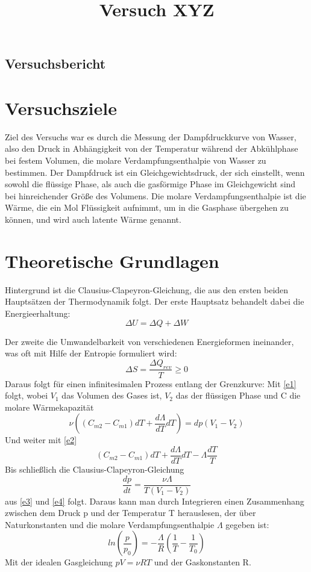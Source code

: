 \documentclass[]{article}
\title{Versuch XYZ}
\begin{document}
	\begin{center}
		\section*{Versuchsbericht}
	\end{center}
\tableofcontents
\section{Versuchsziele}
Ziel des Versuchs war es durch die Messung der Dampfdruckkurve von Wasser, also den Druck in Abhängigkeit von der Temperatur während der Abkühlphase bei festem Volumen, die molare Verdampfungsenthalpie von Wasser zu bestimmen. Der Dampfdruck ist ein Gleichgewichtsdruck, der sich einstellt, wenn sowohl die flüssige Phase, als auch die gasförmige Phase im Gleichgewicht sind bei hinreichender Größe des Volumens. Die molare Verdampfungsenthalpie ist die Wärme, die ein Mol Flüssigkeit aufnimmt, um in die Gasphase übergehen zu können, und wird auch latente Wärme genannt.
\section{Theoretische Grundlagen}
Hintergrund ist die Clausius-Clapeyron-Gleichung, die aus den ersten beiden Hauptsätzen der Thermodynamik folgt.
Der erste Hauptsatz behandelt dabei die Energieerhaltung:
\begin{equation}
	\Delta U =\Delta Q +\Delta W
	\label{e1}
\end{equation}

Der zweite die Umwandelbarkeit von verschiedenen Energieformen ineinander, was oft mit Hilfe der Entropie formuliert wird:
\begin{equation} 
 	 \Delta S=\frac{\Delta Q_{rev}}{T} \ge 0
 	 \label{e2}
 \end{equation}
Daraus folgt für einen infinitesimalen Prozess entlang der Grenzkurve:
Mit \ref{e1} folgt, wobei $V_1$ das Volumen des Gases ist, $V_2$ das der flüssigen Phase und C die molare Wärmekapazität
\begin{equation} 
 	 \nu((C_{m2}-C_{m1})dT+\frac{d\Lambda}{dT}dT)=dp(V_1-V_2)
 	 \label{e3} 
 \end{equation}
Und weiter mit \ref{e2}
\begin{equation} 
	(C_{m2}-C_{m1})dT+\frac{d\Lambda}{dT}dT-\Lambda\frac{dT}{T}
	\label{e4}
\end{equation}
Bis schließlich die Clausius-Clapeyron-Gleichung
\begin{equation} 
 	 \frac{dp}{dt}=\frac{\nu\Lambda}{T(V_1-V_2)} 
 \end{equation} aus \ref{e3} und \ref{e4} folgt.
Daraus kann man durch Integrieren einen Zusammenhang zwischen dem Druck p und der Temperatur T herauslesen, der über Naturkonstanten und die molare Verdampfungsenthalpie $\Lambda$ gegeben ist:
\begin{equation}
	ln(\frac{p}{p_0})=-\frac{\Lambda}{R}(\frac{1}{T}-\frac{1}{T_0})
\end{equation}
Mit der idealen Gasgleichung $pV=\nu RT$ und der Gaskonstanten R.
\end{document}
